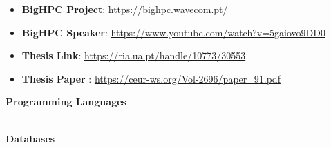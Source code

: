 \documentclass[10pt,a4paper,ragged2e,withhyper]{altacv}
\begin{document}
\begin{paracol}{2}
\begin{itemize}
    
\end{itemize}

  \begin{itemize}
    \item \textbf{BigHPC Project}: \url{https://bighpc.wavecom.pt/}
    \item \textbf{BigHPC Speaker}: \url{https://www.youtube.com/watch?v=5gaiovo9DD0}
    \item \textbf{Thesis Link}: \url{https://ria.ua.pt/handle/10773/30553}
    \item \textbf{Thesis Paper }: \url{https://ceur-ws.org/Vol-2696/paper_91.pdf}
  \end{itemize}



















\switchcolumn





\textbf{Programming Languages} \\
\smallskip
{}
\\

\medskip

\textbf{Databases}\\
\smallskip

\\



\end{paracol}
\end{document}
